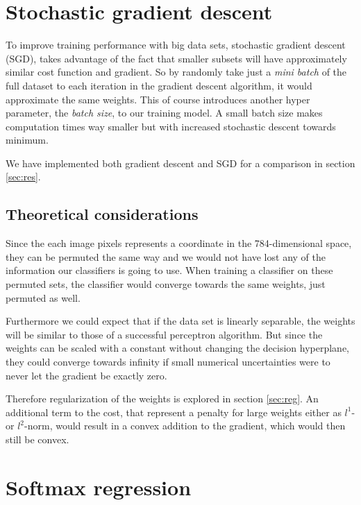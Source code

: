 \documentclass[a4paper,10pt,article,oneside,english]{memoir}
\begin{document}
\section{Stochastic gradient descent}
To improve training performance with big data sets, stochastic gradient descent (SGD), takes advantage of the fact that smaller subsets will have approximately similar cost function and gradient. So by randomly take just a \emph{mini batch} of the full dataset to each iteration in the gradient descent algorithm, it would approximate the same weights. This of course introduces another hyper parameter, the \emph{batch size}, to our training model. A small batch size makes computation times way smaller but with increased stochastic descent towards minimum. 

We have implemented both gradient descent and SGD for a comparison in section \ref{sec:res}.




\subsection{Theoretical considerations} Since the each image pixels represents a coordinate in the 784-dimensional space, they can be permuted the same way and we would not have lost any of the information our classifiers is going to use. When training a classifier on these permuted sets, the classifier would converge towards the same weights, just permuted as well.

Furthermore we could expect that if the data set is linearly separable, the weights will be similar to those of a successful perceptron algorithm. But since the weights can be scaled with a constant without changing the decision hyperplane, they could converge towards infinity if small numerical uncertainties were to never let the gradient be exactly zero. 

Therefore regularization of the weights is explored in section \ref{sec:reg}. An additional term to the cost, that represent a penalty for large weights either as $l^1$- or $l^2$-norm, would result in a convex addition to the gradient, which would then still be convex.




\section{Softmax regression}
\end{document}

